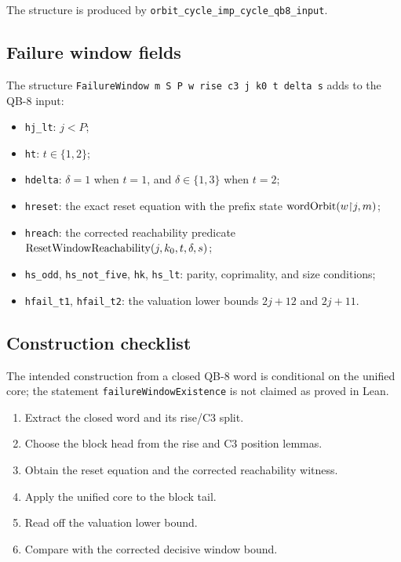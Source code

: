 The structure is produced by
\texttt{orbit\_cycle\_imp\_cycle\_qb8\_input}.

\subsection{Failure window fields}

The structure \texttt{FailureWindow m S P w rise c3 j k0 t delta s}
adds to the QB-8 input:
\begin{itemize}[leftmargin=*]
\item \texttt{hj\_lt}: $j<P$;
\item \texttt{ht}: $t\in\{1,2\}$;
\item \texttt{hdelta}: $\delta=1$ when $t=1$, and
  $\delta\in\{1,3\}$ when $t=2$;
\item \texttt{hreset}: the exact reset equation with the prefix state
  $\mathrm{wordOrbit}(w{\upharpoonright}j,m)$;
\item \texttt{hreach}: the corrected reachability predicate
  $\mathrm{ResetWindowReachability}(j,k_0,t,\delta,s)$;
\item \texttt{hs\_odd}, \texttt{hs\_not\_five}, \texttt{hk},
  \texttt{hs\_lt}: parity, coprimality, and size conditions;
\item \texttt{hfail\_t1}, \texttt{hfail\_t2}: the valuation lower
  bounds $2j+12$ and $2j+11$.
\end{itemize}

\subsection{Construction checklist}

The intended construction from a closed QB-8 word is conditional on
the unified core; the statement \texttt{failureWindowExistence} is not
claimed as proved in Lean.
\begin{enumerate}[leftmargin=*]
\item Extract the closed word and its rise/C3 split.
\item Choose the block head from the rise and C3 position lemmas.
\item Obtain the reset equation and the corrected reachability witness.
\item Apply the unified core to the block tail.
\item Read off the valuation lower bound.
\item Compare with the corrected decisive window bound.
\end{enumerate}


